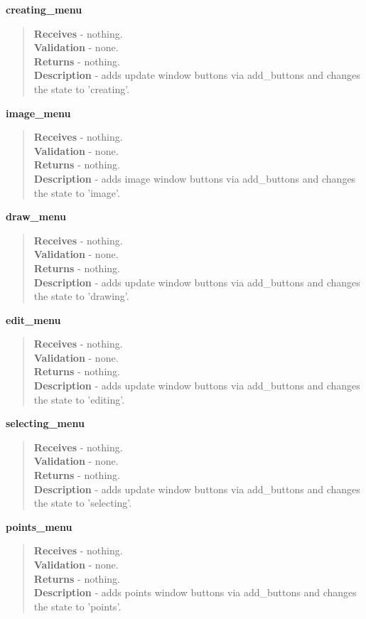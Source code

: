 \documentclass[titlepage]{article}
\begin{document}
\textbf{creating\_menu}
\begin{quote}
\textbf{Receives} - nothing. \\
\textbf{Validation} - none.\\
\textbf{Returns} - nothing. \\
\textbf{Description} - adds update window buttons via add\_buttons and changes the state to 'creating'. 
\end{quote}

\textbf{image\_menu}
\begin{quote}
\textbf{Receives} - nothing. \\
\textbf{Validation} - none.\\
\textbf{Returns} - nothing. \\
\textbf{Description} - adds image window buttons via add\_buttons and changes the state to 'image'.
\end{quote}

\textbf{draw\_menu}
\begin{quote}
\textbf{Receives} - nothing. \\
\textbf{Validation} - none.\\
\textbf{Returns} - nothing. \\
\textbf{Description} - adds update window buttons via add\_buttons and changes the state to 'drawing'.
\end{quote}

\textbf{edit\_menu}
\begin{quote}
\textbf{Receives} - nothing. \\
\textbf{Validation} - none.\\
\textbf{Returns} - nothing. \\
\textbf{Description} - adds update window buttons via add\_buttons and changes the state to 'editing'.
\end{quote}

\textbf{selecting\_menu}
\begin{quote}
\textbf{Receives} - nothing. \\
\textbf{Validation} - none.\\
\textbf{Returns} - nothing. \\
\textbf{Description} - adds update window buttons via add\_buttons and changes the state to 'selecting'.
\end{quote}

\textbf{points\_menu}
\begin{quote}
\textbf{Receives} - nothing. \\
\textbf{Validation} - none.\\
\textbf{Returns} - nothing. \\
\textbf{Description} - adds points window buttons via add\_buttons and changes the state to 'points'.
\end{quote}
\end{document}
